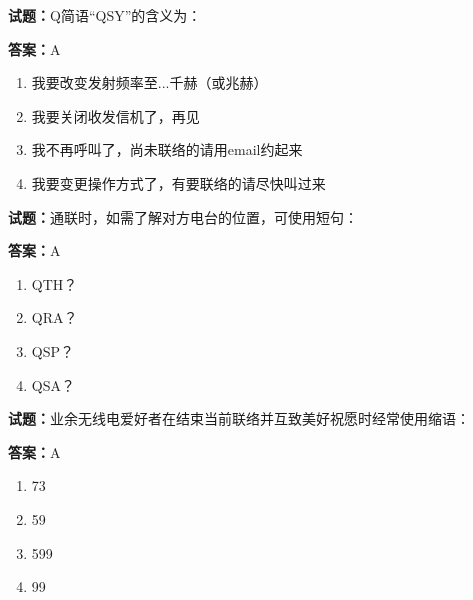 \documentclass{ctexbook}
\begin{document}




\vspace{1em}

\textbf{试题：}Q简语“QSY”的含义为： 

\textbf{答案：}A 

\begin{enumerate}[leftmargin=3em]
  \item 我要改变发射频率至...千赫（或兆赫） 

  \item 我要关闭收发信机了，再见 

  \item 我不再呼叫了，尚未联络的请用email约起来 

  \item 我要变更操作方式了，有要联络的请尽快叫过来 

\end{enumerate}





\vspace{1em}

\textbf{试题：}通联时，如需了解对方电台的位置，可使用短句： 

\textbf{答案：}A 

\begin{enumerate}[leftmargin=3em]
  \item QTH？ 

  \item QRA？ 

  \item QSP？ 

  \item QSA？ 

\end{enumerate}






\vspace{1em}

\textbf{试题：}业余无线电爱好者在结束当前联络并互致美好祝愿时经常使用缩语： 

\textbf{答案：}A 

\begin{enumerate}[leftmargin=3em]
  \item 73 

  \item 59 

  \item 599 

  \item 99 

\end{enumerate}
\end{document}
